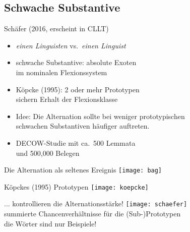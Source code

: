 \subsection{Schwache Substantive}

\begin{frame}
	{Schäfer (2016, erscheint in CLLT)}
	\begin{itemize}
	  \item \textit{einen Linguisten} vs.\ \textit{einen Linguist}
	  \item schwache Substantive: absolute Exoten\\im nominalen Flexionssystem
	  \item Köpcke (1995): 2 oder mehr Prototypen\\sichern Erhalt der Flexionsklasse
	  
	  \vspace{0.5cm}
	  
	  \item \alert{Idee: Die Alternation sollte bei weniger prototypischen\\schwachen Substantiven häufiger auftreten.}
	  
	  \vspace{0.5cm}
	  
	  \item DECOW-Studie mit ca.\ 500 Lemmata\\und \alert{500,000 Belegen}
	\end{itemize}
\end{frame}

\begin{frame}
	{Die Alternation als seltenes Ereignis}
	\centering
	\texttt{[image: bag]}
\end{frame}

\begin{frame}
	{Köpckes (1995) Prototypen}
	\centering
	\texttt{[image: koepcke]}
\end{frame}

\begin{frame}
	{... kontrollieren die Alternationsstärke!}
	\centering
	\texttt{[image: schaefer]}\\
	\vspace{0.5cm}
	summierte Chancenverhältnisse für die (Sub-)Prototypen\\
	die Wörter sind nur Beispiele!
\end{frame}

